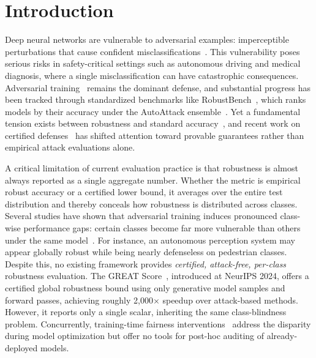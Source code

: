 \section{Introduction}
\label{sec:introduction}

Deep neural networks are vulnerable to adversarial examples: imperceptible perturbations that cause confident misclassifications~\citep{szegedy2014intriguingpropertiesneuralnetworks, goodfellow2015explainingharnessingadversarialexamples}. This vulnerability poses serious risks in safety-critical settings such as autonomous driving and medical diagnosis, where a single misclassification can have catastrophic consequences. Adversarial training~\citep{madry2019deeplearningmodelsresistant} remains the dominant defense, and substantial progress has been tracked through standardized benchmarks like RobustBench~\citep{croce2021robustbenchstandardizedadversarialrobustness}, which ranks models by their accuracy under the AutoAttack ensemble~\citep{croce2020reliableevaluationadversarialrobustness}. Yet a fundamental tension exists between robustness and standard accuracy~\citep{tsipras2019robustnessoddsaccuracy}, and recent work on certified defenses~\citep{cohen2019certifiedadversarialrobustnessrandomized} has shifted attention toward provable guarantees rather than empirical attack evaluations alone.

A critical limitation of current evaluation practice is that robustness is almost always reported as a single aggregate number. Whether the metric is empirical robust accuracy or a certified lower bound, it averages over the entire test distribution and thereby conceals how robustness is distributed across classes. Several studies have shown that adversarial training induces pronounced class-wise performance gaps: certain classes become far more vulnerable than others under the same model~\citep{benz2021robustnessoddsfairnessempirical, xu2021robustfairfairnessadversarial, tian2021analysisapplicationsclasswiserobustness}. For instance, an autonomous perception system may appear globally robust while being nearly defenseless on pedestrian classes. Despite this, no existing framework provides \emph{certified, attack-free, per-class} robustness evaluation. The GREAT Score~\citep{li2024greatscoreglobalrobustness}, introduced at NeurIPS 2024, offers a certified global robustness bound using only generative model samples and forward passes, achieving roughly 2{,}000$\times$ speedup over attack-based methods. However, it reports only a single scalar, inheriting the same class-blindness problem. Concurrently, training-time fairness interventions~\citep{wei2023cfaclasswisecalibratedfair, sun2022improvingrobustfairnessbalance, li2023watimproveworstclassrobustness, zhang2024fairnessawareadversariallearning} address the disparity during model optimization but offer no tools for post-hoc auditing of already-deployed models.

